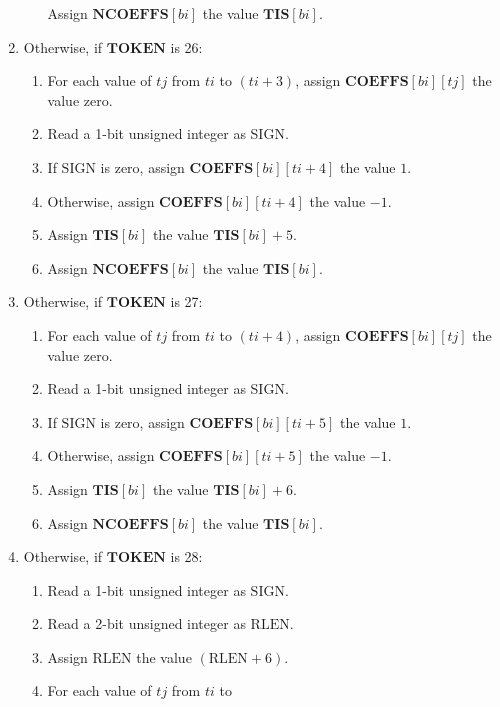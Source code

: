 \documentclass[9pt,letterpaper]{book}
\newcommand{\idx}[1]{{\ensuremath{\mathit{#1}}}}
\newcommand{\bi}{\idx{bi}}
\newcommand{\ti}{\idx{ti}}
\newcommand{\tj}{\idx{tj}}
\newcommand{\bitvar}[1]{\ensuremath{\mathbf{\bm{#1}}}}
\newcommand{\locvar}[1]{\ensuremath{\mathrm{#1}}}
\numberwithin{equation}{chapter}
\numberwithin{figure}{chapter}
\numberwithin{table}{chapter}
\begin{document}
\begin{enumerate}
\begin{enumerate}
Assign $\bitvar{NCOEFFS}[\bitvar{\bi}]$ the value $\bitvar{TIS}[\bitvar{\bi}]$.
\end{enumerate}
\item
Otherwise, if \bitvar{TOKEN} is 26:
\begin{enumerate}
\item
For each value of \locvar{\tj} from \bitvar{\ti} to $(\bitvar{\ti}+3)$, assign
 $\bitvar{COEFFS}[\bitvar{\bi}][\locvar{\tj}]$ the value zero.
\item
Read a 1-bit unsigned integer as SIGN.
\item
If \locvar{SIGN} is zero, assign
 $\bitvar{COEFFS}[\bitvar{\bi}][\bitvar{\ti}+4]$ the value $1$.
\item
Otherwise, assign $\bitvar{COEFFS}[\bitvar{\bi}][\bitvar{\ti}+4]$ the value
 $-1$.
\item
Assign $\bitvar{TIS}[\bitvar{\bi}]$ the value $\bitvar{TIS}[\bitvar{\bi}]+5$.
\item
Assign $\bitvar{NCOEFFS}[\bitvar{\bi}]$ the value $\bitvar{TIS}[\bitvar{\bi}]$.
\end{enumerate}
\item
Otherwise, if \bitvar{TOKEN} is 27:
\begin{enumerate}
\item
For each value of \locvar{\tj} from \bitvar{\ti} to $(\bitvar{\ti}+4)$, assign
 $\bitvar{COEFFS}[\bitvar{\bi}][\locvar{\tj}]$ the value zero.
\item
Read a 1-bit unsigned integer as SIGN.
\item
If \locvar{SIGN} is zero, assign
 $\bitvar{COEFFS}[\bitvar{\bi}][\bitvar{\ti}+5]$ the value $1$.
\item
Otherwise, assign $\bitvar{COEFFS}[\bitvar{\bi}][\bitvar{\ti}+5]$ the value
 $-1$.
\item
Assign $\bitvar{TIS}[\bitvar{\bi}]$ the value $\bitvar{TIS}[\bitvar{\bi}]+6$.
\item
Assign $\bitvar{NCOEFFS}[\bitvar{\bi}]$ the value $\bitvar{TIS}[\bitvar{\bi}]$.
\end{enumerate}
\item
Otherwise, if \bitvar{TOKEN} is 28:
\begin{enumerate}
\item
Read a 1-bit unsigned integer as \locvar{SIGN}.
\item
Read a 2-bit unsigned integer as \locvar{RLEN}.
\item
Assign \locvar{RLEN} the value $(\locvar{RLEN}+6)$.
\item
For each value of \locvar{\tj} from \bitvar{\ti} to

\end{enumerate}
\end{enumerate}
\end{document}
